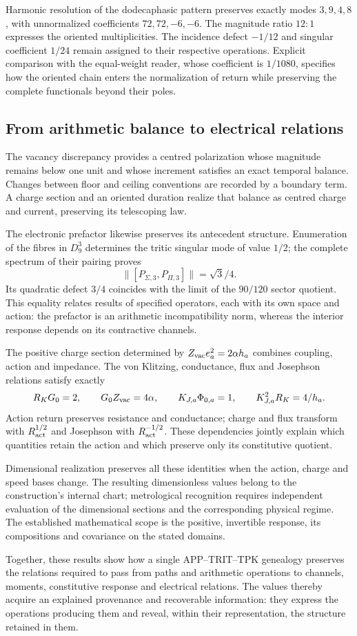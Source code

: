 Harmonic resolution of the dodecaphasic pattern preserves exactly
modes $3,9,4,8$, with unnormalized coefficients $72,72,-6,-6$.
The magnitude ratio $12:1$ expresses the oriented multiplicities.
The incidence defect $-1/12$ and singular coefficient $1/24$
remain assigned to their respective operations. Explicit comparison
with the equal-weight reader, whose coefficient is $1/1080$,
specifies how the oriented chain enters the normalization of return
while preserving the complete functionals beyond their poles.

\subsection*{From arithmetic balance to electrical relations}

The vacancy discrepancy provides a centred polarization whose
magnitude remains below one unit and whose increment satisfies an
exact temporal balance. Changes between floor and ceiling
conventions are recorded by a boundary term. A charge section and
an oriented duration realize that balance as centred charge and
current, preserving its telescoping law.

The electronic prefactor likewise preserves its antecedent
structure. Enumeration of the fibres in $D_9^3$ determines the
tritic singular mode of value $1/2$; the complete spectrum of their
pairing proves
\[
\|[P_{\Sigma,3},P_{\Pi,3}]\|=\sqrt3/4.
\]
Its quadratic defect $3/4$ coincides with the limit of the
$90/120$ sector quotient. This equality relates results of
specified operators, each with its own space and action: the
prefactor is an arithmetic incompatibility norm, whereas the
interior response depends on its contractive channels.

The positive charge section determined by
$Z_{\rm vac}e_a^2=2\alpha h_a$ combines coupling, action and
impedance. The von Klitzing, conductance, flux and Josephson
relations satisfy exactly
\[
R_KG_0=2,\qquad G_0Z_{\rm vac}=4\alpha,\qquad
K_{J,a}\Phi_{0,a}=1,\qquad K_{J,a}^2R_K=4/h_a.
\]
Action return preserves resistance and conductance; charge and
flux transform with $R_{\rm act}^{1/2}$ and Josephson with
$R_{\rm act}^{-1/2}$. These dependencies jointly explain which
quantities retain the action and which preserve only its
constitutive quotient.

Dimensional realization preserves all these identities when the
action, charge and speed bases change. The resulting dimensionless
values belong to the construction's internal chart; metrological
recognition requires independent evaluation of the dimensional
sections and the corresponding physical regime. The established
mathematical scope is the positive, invertible response, its
compositions and covariance on the stated domains.

Together, these results show how a single APP--TRIT--TPK genealogy
preserves the relations required to pass from paths and arithmetic
operations to channels, moments, constitutive response and electrical
relations. The values thereby acquire an explained provenance and
recoverable information: they express the operations producing
them and reveal, within their representation, the structure
retained in them.
\par\endgroup
